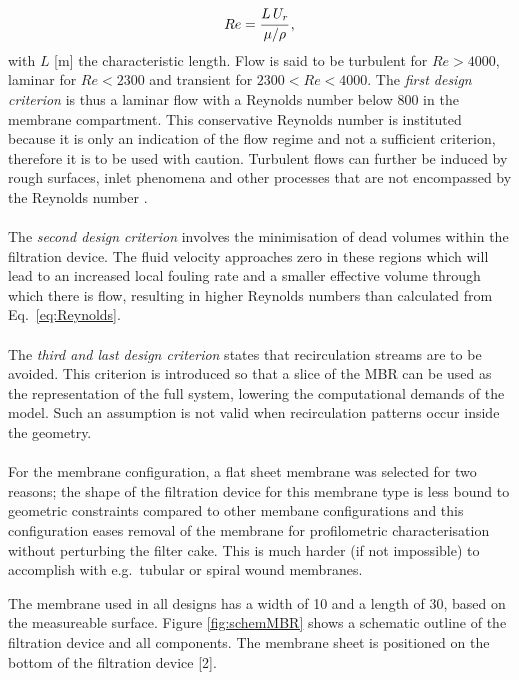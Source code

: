 \begin{equation}
Re = \cfrac{L\, U_r}{\mu/ \rho} \, , 
\label{eq:Reynolds}
\end{equation}
with $L$ [\unit{\metre}] the characteristic length. Flow is said to be turbulent for $Re > 4000$, laminar for $Re < 2300$ and transient for $ 2300 < Re < 4000 $. The \emph{first design criterion} is thus a laminar flow with a Reynolds number below 800 in the membrane compartment. %
This conservative Reynolds number is instituted because it is only an indication of the flow regime and not a sufficient criterion, therefore it is to be used with caution. Turbulent flows can further be induced by rough surfaces, inlet phenomena and other processes that are not encompassed by the Reynolds number \citep{Taylor2006}. \\ \\
The \emph{second design criterion} involves the minimisation of dead volumes within the filtration device. The fluid velocity approaches zero in these regions which will lead to an increased local fouling rate and a smaller effective volume through which there is flow, resulting in higher Reynolds numbers than calculated from Eq.\ \eqref{eq:Reynolds}. \\ \\
The \emph{third and last design criterion} states that recirculation streams are to be avoided. This criterion is introduced so that a slice of the MBR can be used as the representation of the full system, lowering the computational demands of the model. Such an assumption is not valid when recirculation patterns occur inside the geometry. \\ \\
For the membrane configuration, a flat sheet membrane was selected for two reasons; the shape of the filtration device for this membrane type is less bound to geometric constraints compared to other membane configurations and this configuration eases removal of the membrane for profilometric characterisation without perturbing the filter cake. This is much harder (if not impossible) to accomplish with e.g.\ tubular or spiral wound membranes. \par
The membrane used in all designs has a width of \unit{10}{\centi\metre} and a length of \unit{30}{\centi\metre}, based on the measureable surface. Figure \ref{fig:schemMBR} shows a schematic outline of the filtration device and all components. The membrane sheet is positioned on the bottom of the filtration device [2]. \par

